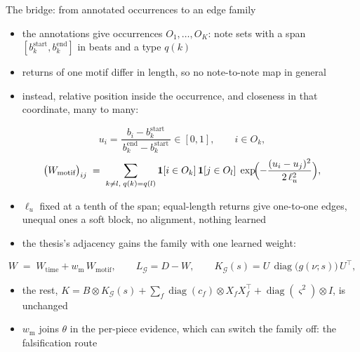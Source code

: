 \documentclass[aspectratio=169,11pt]{beamer}
\newcommand{\Lg}{L_{\mathcal G}}
\newcommand{\diag}{\operatorname{diag}}
\begin{document}
\begin{frame}{The bridge: from annotated occurrences to an edge family}
  \footnotesize
  \begin{itemize}
    \item the annotations give occurrences $O_1, \dots, O_K$: note sets with a span $[b_k^{\text{start}}, b_k^{\text{end}}]$ in beats and a type $q(k)$
    \item returns of one motif differ in length, so no note-to-note map in general
    \item instead, relative position inside the occurrence, and closeness in that coordinate, many to many:
  \end{itemize}
  \vspace{-2mm}
  \[
    u_i = \frac{b_i - b_k^{\text{start}}}{\,b_k^{\text{end}} - b_k^{\text{start}}\,} \in [0, 1],
    \qquad i \in O_k,
  \]
  \vspace{-3mm}
  \[
    \bigl(W_{\text{motif}}\bigr)_{ij} \;=\;
    \sum_{k \neq l,\; q(k) = q(l)} \mathbf 1[i \in O_k]\, \mathbf 1[j \in O_l]\;
    \exp\!\Bigl(-\frac{(u_i - u_j)^2}{2\,\ell_u^2}\Bigr),
  \]
  \vspace{-1mm}
  \begin{itemize}
    \item $\ell_u$ fixed at a tenth of the span; equal-length returns give one-to-one edges, unequal ones a soft block, no alignment, nothing learned
    \item the thesis's adjacency gains the family with one learned weight:
  \end{itemize}
  \vspace{-2mm}
  \[
    W \;=\; W_{\text{time}} + w_{\text{m}}\, W_{\text{motif}}, \qquad
    \Lg = D - W, \qquad
    K_{\mathcal G}(s) = U\,\diag\bigl(g(\nu; s)\bigr)\,U^{\top},
  \]
  \vspace{-1mm}
  \begin{itemize}
    \item the rest, $K = B \otimes K_{\mathcal G}(s) + \sum_f \diag(c_f) \otimes X_f X_f^{\top} + \diag(\varsigma^2) \otimes I$, is unchanged
    \item $w_{\text{m}}$ joins $\theta$ in the per-piece evidence, which can switch the family off: the falsification route
  \end{itemize}
\end{frame}
\end{document}
